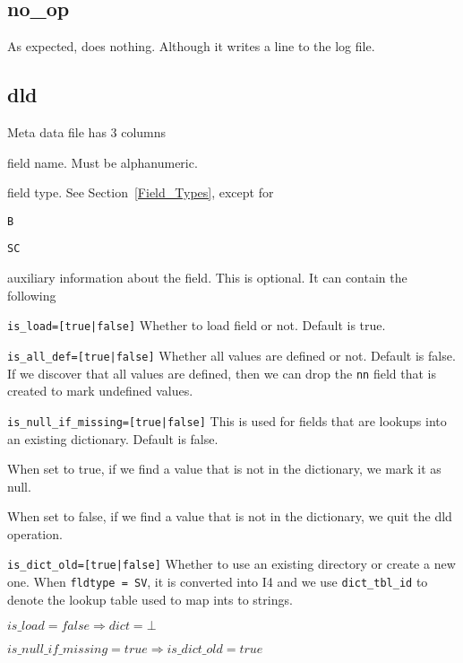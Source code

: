 \documentclass{report}
\begin{document}
\subsection{no\_op}
\label{no_op}

As expected, does nothing. Although it writes a line to the log file. 

\subsection{dld}
\label{dld}

Meta data file has 3 columns
\be
\item field name. Must be alphanumeric.
\item field type. See Section~\ref{Field_Types}, except for
\be
\item {\tt B}
\item {\tt SC}
\ee
\item auxiliary information about the field. This is optional. It can
contain the following
\be
\item \verb+is_load=[true|false]+ Whether to load field or not. Default
is true.
\item \verb+is_all_def=[true|false]+ Whether all values are defined or
not. Default is false. If we discover that all values are defined,
then we can drop the {\tt nn} field that is created to mark undefined
values.
\item \verb+is_null_if_missing=[true|false]+ This is used for fields
that are lookups into an existing dictionary. Default is false.  
\bi
\item When
set to true, if we find a value that is not in the dictionary, we mark
it as null.  
\item When set to false, if we find a value that is not in the
dictionary, we quit the dld operation.
\item \verb+is_dict_old=[true|false]+ Whether to use an existing
directory or create a new one.
\ei
\ee
\ee
When {\tt fldtype = SV}, it is converted into I4 and we use
\verb+dict_tbl_id+ to denote the lookup table used to map ints to
strings.

\begin{invariant}
\(is\_load = false \Rightarrow dict = \bot\)
\end{invariant}

\begin{invariant}
\(is\_null\_if\_missing = true \Rightarrow is\_dict\_old = true \)
\end{invariant}
\end{document}
